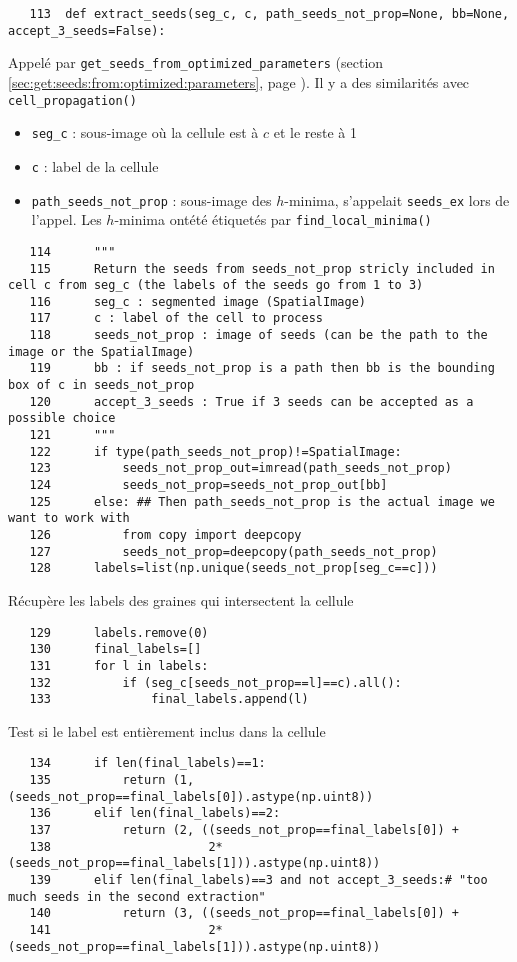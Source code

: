 \documentclass{article}
\def \mycolor {red}
\begin{document}
\begin{verbatim}
   113	def extract_seeds(seg_c, c, path_seeds_not_prop=None, bb=None, accept_3_seeds=False):
\end{verbatim} 
\color{\mycolor}
Appel\'e par \texttt{get\_seeds\_from\_optimized\_parameters} (section \ref{sec:get:seeds:from:optimized:parameters}, page \pageref{sec:get:seeds:from:optimized:parameters}). Il y a des similarit\'es avec \texttt{cell\_propagation()}
\begin{itemize}
\itemsep -1ex
\item \verb|seg_c| : sous-image o\`u la cellule est \`a $c$ et le reste \`a 1
\item \verb|c| : label de la cellule
\item \verb|path_seeds_not_prop| : sous-image des $h$-minima, s'appelait \verb|seeds_ex| lors de l'appel. Les $h$-minima ont\'et\'e \'etiquet\'es par \texttt{find\_local\_minima()}
\end{itemize}
\color{black}
\begin{verbatim}      
   114	    """
   115	    Return the seeds from seeds_not_prop stricly included in cell c from seg_c (the labels of the seeds go from 1 to 3)
   116	    seg_c : segmented image (SpatialImage)
   117	    c : label of the cell to process
   118	    seeds_not_prop : image of seeds (can be the path to the image or the SpatialImage)
   119	    bb : if seeds_not_prop is a path then bb is the bounding box of c in seeds_not_prop
   120	    accept_3_seeds : True if 3 seeds can be accepted as a possible choice
   121	    """
   122	    if type(path_seeds_not_prop)!=SpatialImage:
   123	        seeds_not_prop_out=imread(path_seeds_not_prop)
   124	        seeds_not_prop=seeds_not_prop_out[bb]
   125	    else: ## Then path_seeds_not_prop is the actual image we want to work with
   126	        from copy import deepcopy
   127	        seeds_not_prop=deepcopy(path_seeds_not_prop)
   128	    labels=list(np.unique(seeds_not_prop[seg_c==c]))
\end{verbatim} 
\color{\mycolor}
R\'ecup\`ere les labels des graines qui intersectent la cellule
\color{black}
\begin{verbatim}        
   129	    labels.remove(0)
   130	    final_labels=[]
   131	    for l in labels:
   132	        if (seg_c[seeds_not_prop==l]==c).all():
   133	            final_labels.append(l)    
\end{verbatim} 
\color{\mycolor}
Test si le label est enti\`erement inclus dans la cellule
\color{black}
\begin{verbatim}        
   134	    if len(final_labels)==1:
   135	        return (1, (seeds_not_prop==final_labels[0]).astype(np.uint8))
   136	    elif len(final_labels)==2:
   137	        return (2, ((seeds_not_prop==final_labels[0]) + 
   138	                    2*(seeds_not_prop==final_labels[1])).astype(np.uint8))
   139	    elif len(final_labels)==3 and not accept_3_seeds:# "too much seeds in the second extraction"
   140	        return (3, ((seeds_not_prop==final_labels[0]) + 
   141	                    2*(seeds_not_prop==final_labels[1])).astype(np.uint8))
\end{verbatim} 
\end{document}
